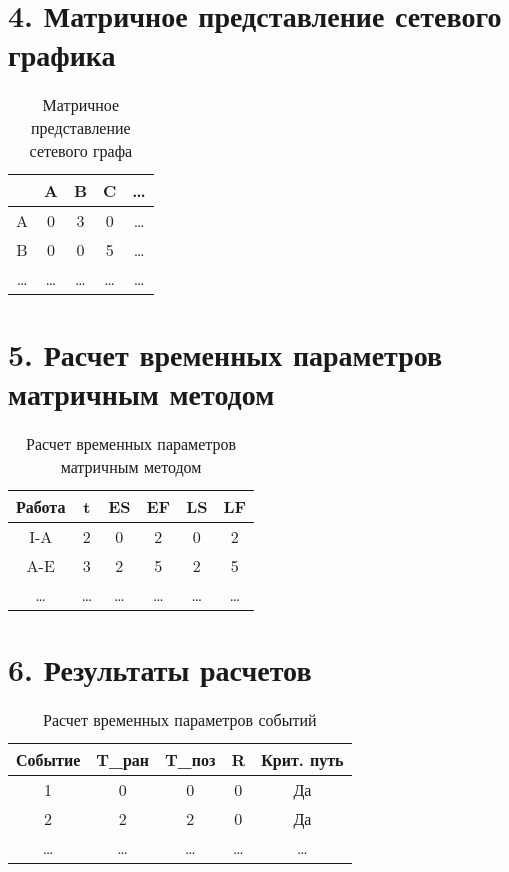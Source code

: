 \documentclass[12pt]{article}
\begin{document}
\section*{4. Матричное представление сетевого графика}
\begin{table}[H]
    \centering
    \begin{tabular}{|c|c|c|c|c|}
        \hline
        & A & B & C & \ldots \\
        \hline
        A & 0 & 3 & 0 & \ldots \\
        \hline
        B & 0 & 0 & 5 & \ldots \\
        \hline
        \ldots & \ldots & \ldots & \ldots & \ldots \\
        \hline
    \end{tabular}
    \caption{Матричное представление сетевого графа}
\end{table}

\section*{5. Расчет временных параметров матричным методом}
\begin{table}[H]
    \centering
    \begin{tabular}{|c|c|c|c|c|c|}
        \hline
        Работа & t & ES & EF & LS & LF \\
        \hline
        I-A & 2 & 0 & 2 & 0 & 2 \\
        \hline
        A-E & 3 & 2 & 5 & 2 & 5 \\
        \hline
        \ldots & \ldots & \ldots & \ldots & \ldots & \ldots \\
        \hline
    \end{tabular}
    \caption{Расчет временных параметров матричным методом}
\end{table}

\section*{6. Результаты расчетов}
\begin{table}[H]
    \centering
    \begin{tabular}{|c|c|c|c|c|}
        \hline
        Событие & T\_ран & T\_поз & R & Крит. путь \\
        \hline
        1 & 0 & 0 & 0 & Да \\
        \hline
        2 & 2 & 2 & 0 & Да \\
        \hline
        \ldots & \ldots & \ldots & \ldots & \ldots \\
        \hline
    \end{tabular}
    \caption{Расчет временных параметров событий}
\end{table}
\end{document}
